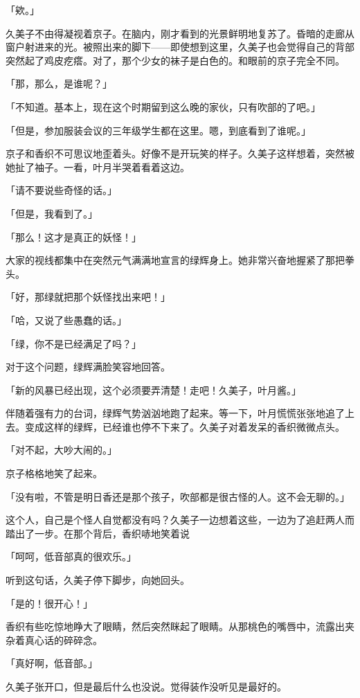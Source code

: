 \documentclass[UTF8]{ctexart}
\begin{document}
    「欸。」

    久美子不由得凝视着京子。在脑内，刚才看到的光景鲜明地复苏了。昏暗的走廊从窗户射进来的光。被照出来的脚下——即使想到这里，久美子也会觉得自己的背部突然起了鸡皮疙瘩。对了，那个少女的袜子是白色的。和眼前的京子完全不同。

    「那，那么，是谁呢？」

    「不知道。基本上，现在这个时期留到这么晚的家伙，只有吹部的了吧。」

    「但是，参加服装会议的三年级学生都在这里。嗯，到底看到了谁呢。」

    京子和香织不可思议地歪着头。好像不是开玩笑的样子。久美子这样想着，突然被她扯了袖子。一看，叶月半哭着看着这边。

    「请不要说些奇怪的话。」

    「但是，我看到了。」

    「那么！这才是真正的妖怪！」

    大家的视线都集中在突然元气满满地宣言的绿辉身上。她非常兴奋地握紧了那把拳头。

    「好，那绿就把那个妖怪找出来吧！」

    「哈，又说了些愚蠢的话。」

    「绿，你不是已经满足了吗？」

    对于这个问题，绿辉满脸笑容地回答。

    「新的风暴已经出现，这个必须要弄清楚！走吧！久美子，叶月酱。」

    伴随着强有力的台词，绿辉气势汹汹地跑了起来。等一下，叶月慌慌张张地追了上去。变成这样的绿辉，已经谁也停不下来了。久美子对着发呆的香织微微点头。

    「对不起，大吵大闹的。」

    京子格格地笑了起来。

    「没有啦，不管是明日香还是那个孩子，吹部都是很古怪的人。这不会无聊的。」

    这个人，自己是个怪人自觉都没有吗？久美子一边想着这些，一边为了追赶两人而踏出了一步。在那个背后，香织哧地笑着说

    「呵呵，低音部真的很欢乐。」

    听到这句话，久美子停下脚步，向她回头。

    「是的！很开心！」

    香织有些吃惊地睁大了眼睛，然后突然眯起了眼睛。从那桃色的嘴唇中，流露出夹杂着真心话的碎碎念。

    「真好啊，低音部。」

    久美子张开口，但是最后什么也没说。觉得装作没听见是最好的。
\end{document}

